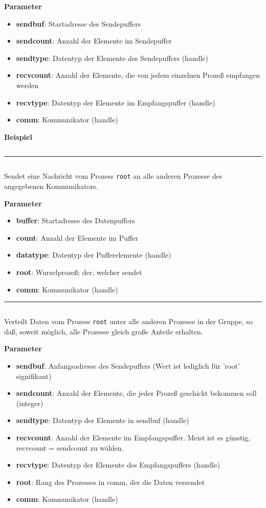 \textbf{Parameter}
\begin{itemize}
    \item \textbf{sendbuf}: Startadresse des Sendepuffers 
    \item \textbf{sendcount}: Anzahl der Elemente im Sendepuffer
    \item \textbf{sendtype}: Datentyp der Elemente des Sendepuffers (handle) 
    \item \textbf{recvcount}: Anzahl der Elemente, die von jedem einzelnen Prozeß empfangen werden
    \item \textbf{recvtype}: Datentyp der Elemente im Empfangspuffer (handle) 
    \item \textbf{comm}: Kommunikator (handle)
\end{itemize}

\textbf{Beispiel}
\inputminted[numbersep=5pt, tabsize=4]{c}{scripts/mpi/mpi-alltoall-example.c}
\goodbreak
\rule{\textwidth}{0.4pt}%
\inputminted[numbersep=5pt, tabsize=4]{c}{scripts/mpi/mpi-bcast.c}
Sendet eine Nachricht vom Prozess \texttt{root} an alle anderen Prozesse des 
angegebenen Kommunikators.

\textbf{Parameter}
\begin{itemize}
    \item \textbf{buffer}: Startadresse des Datenpuffers 
    \item \textbf{count}: Anzahl der Elemente im Puffer
    \item \textbf{datatype}: Datentyp der Pufferelemente (handle) 
    \item \textbf{root}: Wurzelprozeß; der, welcher sendet
    \item \textbf{comm}: Kommunikator (handle)
\end{itemize}
\goodbreak
\rule{\textwidth}{0.4pt}%
\inputminted[numbersep=5pt, tabsize=4]{c}{scripts/mpi/mpi-scatter.c}
Verteilt Daten vom Prozess \texttt{root} unter alle anderen Prozesse in der Gruppe, so daß, soweit möglich, alle Prozesse gleich große Anteile erhalten.

\textbf{Parameter}
\begin{itemize}
    \item \textbf{sendbuf}: Anfangsadresse des Sendepuffers (Wert ist lediglich für 'root' signifikant) 
    \item \textbf{sendcount}: Anzahl der Elemente, die jeder Prozeß geschickt bekommen soll (integer) 
    \item \textbf{sendtype}: Datentyp der Elemente in sendbuf (handle) 
    \item \textbf{recvcount}: Anzahl der Elemente im Empfangspuffer. Meist ist es günstig, recvcount = sendcount zu wählen. 
    \item \textbf{recvtype}: Datentyp der Elemente des Empfangspuffers (handle) 
    \item \textbf{root}: Rang des Prozesses in comm, der die Daten versendet
    \item \textbf{comm}: Kommunikator (handle)
\end{itemize}

